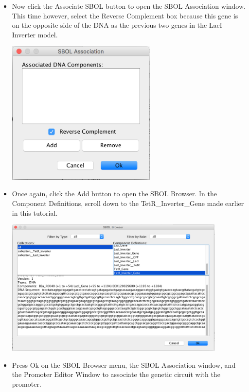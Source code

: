 \documentclass[titlepage,11pt]{article}
\begin{document}
\begin{itemize}
\item Now click the Associate SBOL button to open the SBOL Association window. This time however, select the Reverse Complement box because this gene is on the opposite side of the DNA as the previous two genes in the LacI Inverter model.

\begin{center}
\includegraphics[width=75mm]{screenshots/TetRInverterSBOL}
\end{center}

\item Once again, click the Add button to open the SBOL Browser. In the Component Definitions, scroll down to the TetR\_Inverter\_Gene made earlier in this tutorial.

\begin{center}
\includegraphics[width=110mm]{screenshots/TetRInverterSBOLBrowser}
\end{center}

\item Press Ok on the SBOL Browser menu, the SBOL Association window, and the Promoter Editor Window to associate the genetic circuit with the promoter.


\end{itemize}
\end{document}
